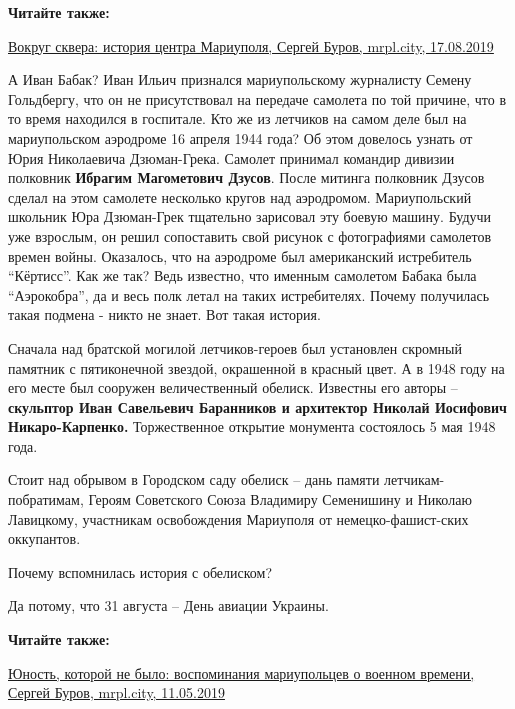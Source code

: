 \textbf{Читайте также:} 

\href{https://archive.org/details/17_08_2019.sergij_burov.mrpl_city.vokrug_skvera_istoria_centra_mariupoljaia-centra-mariupolja}{%
Вокруг сквера: история центра Мариуполя, Сергей Буров, mrpl.city, 17.08.2019}

А Иван Бабак? Иван Ильич признался мариупольскому журналисту Семену Гольдбергу,
что он не присутствовал на передаче самолета по той причине, что в то время
находился в госпитале. Кто же из летчиков на самом деле был на мариупольском
аэродроме 16 апреля 1944 года? Об этом довелось узнать от Юрия Николаевича
Дзюман-Грека. Самолет принимал командир дивизии полковник \textbf{Ибрагим Магометович
Дзусов}. После митинга полковник Дзусов сделал на этом самолете несколько кругов
над аэродромом. Мариупольский школьник Юра Дзюман-Грек тщательно зарисовал эту
боевую машину. Будучи уже взрослым, он решил сопоставить свой рисунок с
фотографиями самолетов времен войны. Оказалось, что на аэродроме был
американский истребитель \enquote{Кёртисс}. Как же так? Ведь известно, что именным
самолетом Бабака была \enquote{Аэрокобра}, да и весь полк летал на таких истребителях.
Почему получилась такая подмена - никто не знает. Вот такая история.

Сначала над братской могилой летчиков-героев был установлен скромный памятник с
пятиконечной звездой, окрашенной в красный цвет. А в 1948 году на его месте был
сооружен величественный обелиск. Известны его авторы – \textbf{скульптор Иван
Савельевич Баранников и архитектор Николай Иосифович Никаро-Карпенко.}
Торжественное открытие монумента состоялось 5 мая 1948 года.

Стоит над обрывом в Городском саду обелиск – дань памяти летчикам-побратимам,
Героям Советского Союза Владимиру Семенишину и Николаю Лавицкому, участникам
освобождения Мариуполя от немецко-фашист\hyp{}ских оккупантов.

Почему вспомнилась история с обелиском?

Да потому, что 31 августа – День авиации Украины.

\textbf{Читайте также:} 

\href{https://archive.org/details/11_05_2019.sergij_burov.mrpl_city.junost_kotoroj_ne_bylo_vospominania_vojna}{%
Юность, которой не было: воспоминания мариупольцев о военном времени, Сергей Буров, mrpl.city, 11.05.2019}

